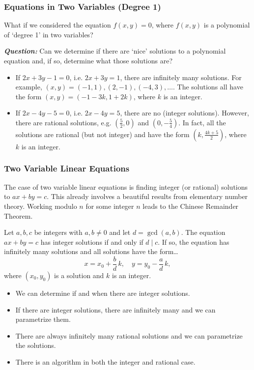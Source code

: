 \begin{frame}[plain] \frametitle{Equations in Two Variables (Degree 1)}
What if we considered the equation $f(x, y)= 0$, where $f(x, y)$ is a polynomial of `degree 1' in two variables? \par\vspace{0.3cm}

{\itshape \bfseries Question:} Can we determine if there are `nice' solutions to a polynomial equation and, if so, determine what those solutions are? \par\vspace{0.3cm} 

\begin{ex}
	\begin{itemize}
	\item If $2x + 3y - 1= 0$, i.e. $2x+ 3y= 1$, there are infinitely many solutions. For example, $(x, y) = (-1, 1), (2, -1), (-4, 3), \ldots$. The solutions all have the form $(x, y)= (-1 - 3k, 1 + 2k)$, where $k$ is an integer. 
	\item If $2x - 4y - 5= 0$, i.e. $2x - 4y= 5$, there are no (integer solutions). However, there are rational solutions, e.g. $(\frac{5}{2}, 0)$ and $(0, -\frac{5}{4})$. In fact, all the solutions are rational (but not integer) and have the form $(k, \frac{4k + 5}{2})$, where $k$ is an integer. 
	\end{itemize}
\end{ex}
\end{frame}



\begin{frame}[plain] \frametitle{Two Variable Linear Equations} \scriptsize
The case of two variable linear equations is finding integer (or rational) solutions to $ax + by= c$. This already involves a beautiful results from elementary number theory. Working modulo $n$ for some integer $n$ leads to the Chinese Remainder Theorem. 

\begin{thm}
Let $a, b, c$ be integers with $a, b \neq 0$ and let $d= \gcd(a, b)$. The equation $ax + by= c$ has integer solutions if and only if $d \mid c$. If so, the equation has infinitely many solutions and all solutions have the form\dots
	\[
	x= x_0 + \frac{b}{d} \, k, \quad y= y_0 - \frac{a}{d} \, k,
	\]
where $(x_0, y_0)$ is a solution and $k$ is an integer. 
\end{thm}

\begin{itemize}
\item We can determine if and when there are integer solutions.
\item If there are integer solutions, there are infinitely many and we can parametrize them.
\item There are always infinitely many rational solutions and we can parametrize the solutions.
\item There is an algorithm in both the integer and rational case. 
\end{itemize}
\end{frame}



